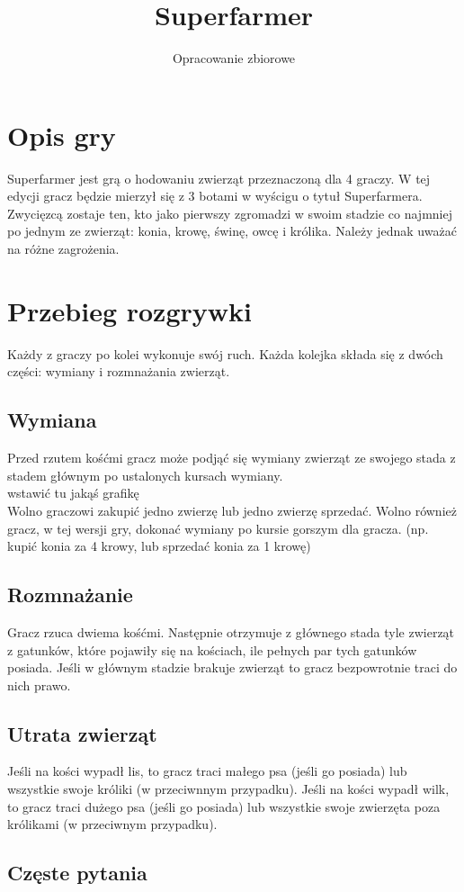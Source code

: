 \documentclass{article}
\title{Superfarmer}
\author{Opracowanie zbiorowe}
\begin{document}
\maketitle

\section{Opis gry}
Superfarmer jest grą o hodowaniu zwierząt przeznaczoną dla 4 graczy. W tej edycji gracz będzie mierzył się z 3 botami w wyścigu o tytuł Superfarmera. Zwycięzcą zostaje ten, kto jako pierwszy zgromadzi w swoim stadzie co najmniej po jednym ze zwierząt: konia, krowę, świnę, owcę i królika. Należy jednak uważać na różne zagrożenia.


\section{Przebieg rozgrywki}
Każdy z graczy po kolei wykonuje swój ruch. Każda kolejka składa się z dwóch części: wymiany i rozmnażania zwierząt.
\subsection{Wymiana}
Przed rzutem kośćmi gracz może podjąć się wymiany zwierząt ze swojego stada z stadem głównym po ustalonych kursach wymiany.
\\
wstawić tu jakąś grafikę
\\
Wolno graczowi zakupić jedno zwierzę lub jedno zwierzę sprzedać.
Wolno również gracz, w tej wersji gry, dokonać wymiany po kursie gorszym dla gracza. (np. kupić konia za 4 krowy, lub sprzedać konia za 1 krowę)
\subsection{Rozmnażanie}
Gracz rzuca dwiema kośćmi. Następnie otrzymuje z głównego stada tyle zwierząt z gatunków, które pojawiły się na kościach, ile pełnych par tych gatunków posiada. Jeśli w głównym stadzie brakuje zwierząt to gracz bezpowrotnie traci do nich prawo.
\subsection{Utrata zwierząt}
Jeśli na kości wypadł lis, to gracz traci małego psa (jeśli go posiada) lub wszystkie swoje króliki (w przeciwnnym przypadku).
Jeśli na kości wypadł wilk, to gracz traci dużego psa (jeśli go posiada) lub wszystkie swoje zwierzęta poza królikami (w przeciwnym przypadku).




\subsection{Częste pytania}
\end{document}
